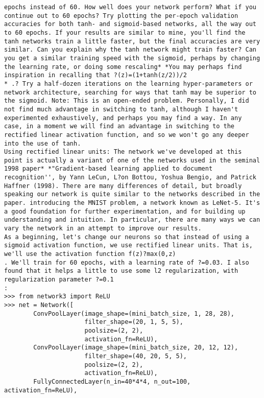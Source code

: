 \begin{lstlisting}
epochs instead of 60. How well does your network perform? What if you continue out to 60 epochs? Try plotting the per-epoch validation accuracies for both tanh- and sigmoid-based networks, all the way out to 60 epochs. If your results are similar to mine, you'll find the tanh networks train a little faster, but the final accuracies are very similar. Can you explain why the tanh network might train faster? Can you get a similar training speed with the sigmoid, perhaps by changing the learning rate, or doing some rescaling* *You may perhaps find inspiration in recalling that ?(z)=(1+tanh(z/2))/2
* .? Try a half-dozen iterations on the learning hyper-parameters or network architecture, searching for ways that tanh may be superior to the sigmoid. Note: This is an open-ended problem. Personally, I did not find much advantage in switching to tanh, although I haven't experimented exhaustively, and perhaps you may find a way. In any case, in a moment we will find an advantage in switching to the rectified linear activation function, and so we won't go any deeper into the use of tanh. 
Using rectified linear units: The network we've developed at this point is actually a variant of one of the networks used in the seminal 1998 paper* *"Gradient-based learning applied to document recognition'', by Yann LeCun, L?on Bottou, Yoshua Bengio, and Patrick Haffner (1998). There are many differences of detail, but broadly speaking our network is quite similar to the networks described in the paper. introducing the MNIST problem, a network known as LeNet-5. It's a good foundation for further experimentation, and for building up understanding and intuition. In particular, there are many ways we can vary the network in an attempt to improve our results.
As a beginning, let's change our neurons so that instead of using a sigmoid activation function, we use rectified linear units. That is, we'll use the activation function f(z)?max(0,z)
. We'll train for 60 epochs, with a learning rate of ?=0.03. I also found that it helps a little to use some l2 regularization, with regularization parameter ?=0.1
:
>>> from network3 import ReLU
>>> net = Network([
        ConvPoolLayer(image_shape=(mini_batch_size, 1, 28, 28), 
                      filter_shape=(20, 1, 5, 5), 
                      poolsize=(2, 2), 
                      activation_fn=ReLU),
        ConvPoolLayer(image_shape=(mini_batch_size, 20, 12, 12), 
                      filter_shape=(40, 20, 5, 5), 
                      poolsize=(2, 2), 
                      activation_fn=ReLU),
        FullyConnectedLayer(n_in=40*4*4, n_out=100, activation_fn=ReLU),

\end{lstlisting}

